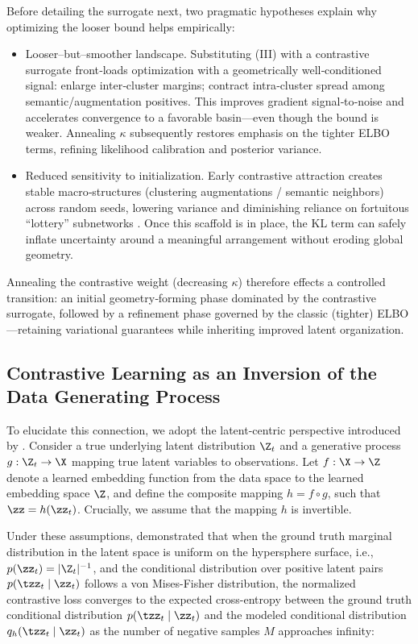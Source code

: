 Before detailing the surrogate next, two pragmatic hypotheses explain why optimizing the looser bound helps empirically:
\begin{itemize}
    \item Looser–but–smoother landscape. Substituting (III) with a contrastive surrogate front‑loads optimization with a geometrically well‑conditioned signal: enlarge inter‑cluster margins; contract intra‑cluster spread among semantic/augmentation positives. This improves gradient signal‑to‑noise and accelerates convergence to a favorable basin—even though the bound is weaker. Annealing $\kappa$ subsequently restores emphasis on the tighter ELBO terms, refining likelihood calibration and posterior variance.
    \item Reduced sensitivity to initialization. Early contrastive attraction creates stable macro‑structures (clustering augmentations / semantic neighbors) across random seeds, lowering variance and diminishing reliance on fortuitous “lottery” subnetworks \cite{frankle2018lottery}. Once this scaffold is in place, the KL term can safely inflate uncertainty around a meaningful arrangement without eroding global geometry.
\end{itemize}

Annealing the contrastive weight (decreasing $\kappa$) therefore effects a controlled transition: an initial geometry‑forming phase dominated by the contrastive surrogate, followed by a refinement phase governed by the classic (tighter) ELBO—retaining variational guarantees while inheriting improved latent organization.

\subsection{Contrastive Learning as an Inversion of the Data Generating Process}
\label{sec:contr}

To elucidate this connection, we adopt the latent-centric perspective introduced by \cite{Zimmermann2021-ax}. Consider a true underlying latent distribution $\Z_t$ and a generative process $g: \Z_t \rightarrow \X$ mapping true latent variables to observations. Let $f: \X \rightarrow \Z$ denote a learned embedding function from the data space to the learned embedding space $\Z$, and define the composite mapping $h = f \circ g$, such that $\zz = h(\zz_t)$. Crucially, we assume that the mapping $h$ is invertible.

Under these assumptions, \cite{Zimmermann2021-ax} demonstrated that when the ground truth marginal distribution in the latent space is uniform on the hypersphere surface, i.e., $p(\zz_t) = |\Z_t|^{-1}$, and the conditional distribution over positive latent pairs $p(\tzz_t \mid \zz_t)$ follows a von Mises-Fisher distribution, the normalized contrastive loss converges to the expected cross-entropy between the ground truth conditional distribution $p(\tzz_t \mid \zz_t)$ and the modeled conditional distribution $q_h(\tzz_t \mid \zz_t)$ as the number of negative samples $M$ approaches infinity:

